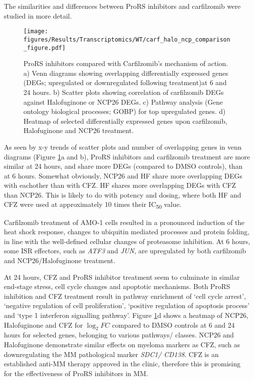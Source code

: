 The similarities and differences between ProRS inhibitors and carfilzomib were studied in more detail.
\begin{figure}[p]
\centering
\texttt{[image: figures/Results/Transcriptomics/WT/carf\_halo\_ncp\_comparison\_figure.pdf]}
\caption[ProRS inhibitors compared with Carfilzomib's mechanism of action]{ProRS inhibitors compared with Carfilzomib's mechanism of action.
a) Venn diagrams showing overlapping differentially expressed genes (DEGs; upregulated or downregulated following treatment)at 6 and 24 hours.
b) Scatter plots showing correlation of carfilzomib DEGs against Halofuginone or NCP26 DEGs.
c) Pathway analysis (Gene ontology biological processes; GOBP) for top upregulated genes.
d) Heatmap of selected differentially expressed genes upon carfilzomib, Halofuginone and NCP26 treatment.
}
\label{fig:wt_carf_compare}
\end{figure}
As seen by x-y trends of scatter plots and number of overlapping genes in venn diagrams (Figure \ref{fig:wt_carf_compare}a and b), ProRS inhibitors and carfilzomib treatment are more similar at 24 hours, and share more DEGs (compared to DMSO controls), than at 6 hours.
Somewhat obviously, NCP26 and HF share more overlapping DEGs with eachother than with CFZ\@.
HF shares more overlapping DEGs with CFZ than NCP26.
This is likely to do with potency and dosing, where both HF and CFZ were used at approximately 10 times their IC\textsubscript{50} value.

Carfilzomib treatment of AMO-1 cells resulted in a pronounced induction of the heat shock response, changes to ubiquitin mediated processes and protein folding, in line with the well-defined cellular changes of proteasome inhibition.
At 6 hours, some ISR effectors, such as \textit{ATF3} and \textit{JUN}, are upregulated by both carfilzomib and NCP26/Halofuginone treatment.

At 24 hours, CFZ and ProRS inhibitor treatment seem to culminate in similar end-stage stress, cell cycle changes and apoptotic mechanisms.
Both ProRS inhibition and CFZ treatment result in pathway enrichment of `cell cycle arrest', `negative regulation of cell proliferation', `positive regulation of apoptosis process' and `type 1 interferon signalling pathway'.
Figure \ref{fig:wt_carf_compare}d shows a heatmap of NCP26, Halofuginone and CFZ for $\log_{2}FC$ compared to DMSO controls at 6 and 24 hours for selected genes, belonging to various pathways/ classes.
NCP26 and Halofuginone demonstrate similar effects on myeloma markers as CFZ, such as downregulating the MM pathological marker \textit{SDC1/ CD138}.
CFZ is an established anti-MM therapy approved in the clinic, therefore this is promising for the effectiveness of ProRS inhibitors in MM.


